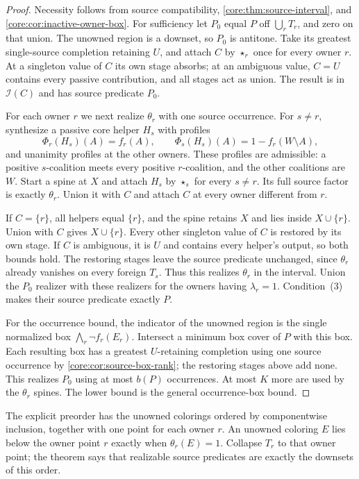 \begin{proof}
Necessity follows from source compatibility,
\cref{core:thm:source-interval}, and \cref{core:cor:inactive-owner-box}.
For sufficiency let $P_0$ equal $P$ off $\bigcup_rT_r$, and zero
on that union. The unowned region is a downset, so $P_0$ is antitone.
Take its greatest single-source completion retaining $U$, and attach
$C$ by $\star_r$ once for every owner $r$. At a singleton value of
$C$ its own stage absorbs; at an ambiguous value, $C=U$ contains
every passive contribution, and all stages act as union. The result
is in $\mathcal I(C)$ and has source predicate $P_0$.

For each owner $r$ we next realize $\theta_r$ with one source occurrence.
For $s\ne r$, synthesize a passive core helper $H_s$ with profiles
\[
 \Phi_r(H_s)(A)=f_r(A),\qquad
 \Phi_s(H_s)(A)=1-f_r(W\setminus A),
\]
and unanimity profiles at the other owners. These profiles are
admissible: a positive $s$-coalition meets every positive $r$-coalition,
and the other coalitions are $W$. Start a spine at $X$ and attach
$H_s$ by $\star_s$ for every $s\ne r$. Its full source factor is
exactly $\theta_r$. Union it with $C$ and attach $C$ at every
owner different from $r$.

If $C=\{r\}$, all helpers equal $\{r\}$, and the spine retains $X$
and lies inside $X\cup\{r\}$. Union with $C$ gives $X\cup\{r\}$.
Every other singleton value of $C$ is restored by its own stage.
If $C$ is ambiguous, it is $U$ and contains every helper's output,
so both bounds hold. The restoring stages leave the source predicate
unchanged, since $\theta_r$ already vanishes on every foreign $T_s$.
Thus this realizes $\theta_r$ in the interval.
Union the $P_0$ realizer with these realizers for the owners having
$\lambda_r=1$. Condition~(3) makes their source predicate exactly $P$.

For the occurrence bound, the indicator of the unowned region is the
single normalized box $\bigwedge_r\neg f_r(E_r)$. Intersect a minimum
box cover of $P$ with this box. Each resulting box has a greatest
$U$-retaining completion using one source occurrence by
\cref{core:cor:source-box-rank}; the restoring stages above add none.
This realizes $P_0$ using at most $b(P)$ occurrences. At most $K$ more
are used by the $\theta_r$ spines. The lower bound is the general
occurrence-box bound.
\end{proof}

The explicit preorder has the unowned colorings ordered by componentwise
inclusion, together with one point for each owner $r$. An unowned
coloring $E$ lies below the owner point $r$ exactly when
$\theta_r(E)=1$. Collapse $T_r$ to that owner point; the theorem says
that realizable source predicates are exactly the downsets of this order.

